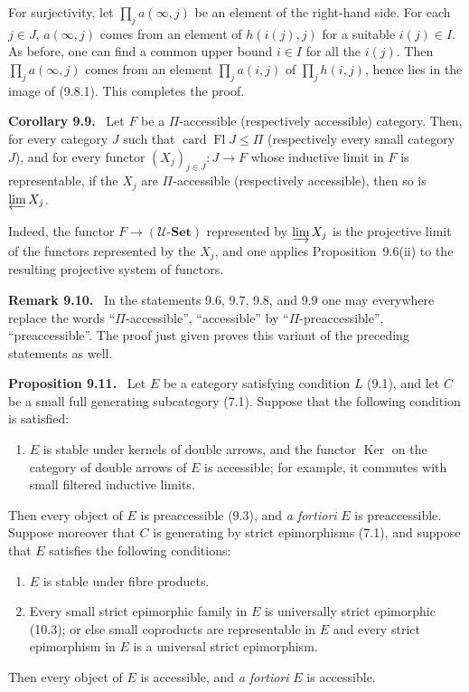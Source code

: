 \documentclass[11pt]{article}
\newcommand{\U}{\mathcal{U}}
\newcommand{\Set}{\mathbf{Set}}
\newcommand{\Ker}{\operatorname{Ker}}
\newcommand{\card}{\operatorname{card}}
\newcommand{\Fl}{\operatorname{Fl}}
\newenvironment{statement}[1]{\par\medskip\noindent\textbf{#1.}\ }{\par\medskip}
\newenvironment{remarktext}[1]{\par\medskip\noindent\textbf{#1.}\ }{\par\medskip}
\begin{document}
For surjectivity, let $\prod_j a(\infty,j)$ be an element of the right-hand side. For each $j\in J$, $a(\infty,j)$ comes from an element of $h(i(j),j)$ for a suitable $i(j)\in I$. As before, one can find a common upper bound $i\in I$ for all the $i(j)$. Then $\prod_j a(\infty,j)$ comes from an element $\prod_j a(i,j)$ of $\prod_j h(i,j)$, hence lies in the image of (9.8.1). This completes the proof.

\begin{statement}{Corollary 9.9}
Let $F$ be a $\Pi$-accessible (respectively accessible) category. Then, for every category $J$ such that $\card\Fl J\leq \Pi$ (respectively every small category $J$), and for every functor $(X_j)_{j\in J}:J\to F$ whose inductive limit in $F$ is representable, if the $X_j$ are $\Pi$-accessible (respectively accessible), then so is $\varprojlim X_j$.
\end{statement}

Indeed, the functor $F\to(\U\text{-}\Set)$ represented by $\varinjlim X_j$ is the projective limit of the functors represented by the $X_j$, and one applies Proposition~9.6(ii) to the resulting projective system of functors.

\begin{remarktext}{Remark 9.10}
In the statements 9.6, 9.7, 9.8, and 9.9 one may everywhere replace the words ``$\Pi$-accessible'', ``accessible'' by ``$\Pi$-preaccessible'', ``preaccessible''. The proof just given proves this variant of the preceding statements as well.
\end{remarktext}

\begin{statement}{Proposition 9.11}
Let $E$ be a category satisfying condition $L$ (9.1), and let $C$ be a small full generating subcategory (7.1). Suppose that the following condition is satisfied:
\begin{enumerate}[label=\alph*)]
\item $E$ is stable under kernels of double arrows, and the functor $\Ker$ on the category of double arrows of $E$ is accessible; for example, it commutes with small filtered inductive limits.
\end{enumerate}
Then every object of $E$ is preaccessible (9.3), and \emph{a fortiori} $E$ is preaccessible. Suppose moreover that $C$ is generating by strict epimorphisms (7.1), and suppose that $E$ satisfies the following conditions:
\begin{enumerate}[label=\alph*),resume]
\item $E$ is stable under fibre products.
\item Every small strict epimorphic family in $E$ is universally strict epimorphic (10.3); or else small coproducts are representable in $E$ and every strict epimorphism in $E$ is a universal strict epimorphism.
\end{enumerate}
Then every object of $E$ is accessible, and \emph{a fortiori} $E$ is accessible.
\end{statement}
\end{document}
